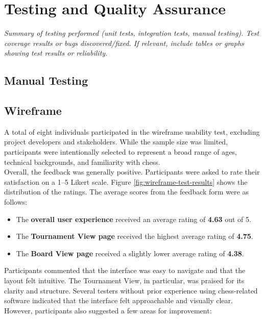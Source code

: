 \section{Testing and Quality Assurance}
\textit{Summary of testing performed (unit tests, integration tests, manual testing). Test coverage results or bugs discovered/fixed. If relevant, include tables or graphs showing test results or reliability.}

\subsection{Manual Testing}

\subsection{Wireframe}
\label{subsec:wireframe-results}

A total of eight individuals participated in the wireframe usability test, excluding project developers and stakeholders. While the sample size was limited, participants were intentionally selected to represent a broad range of ages, technical backgrounds, and familiarity with chess. \\

Overall, the feedback was generally positive. Participants were asked to rate their satisfaction on a 1–5 Likert scale. Figure \ref{fig:wireframe-test-results} shows the distribution of the ratings. The average scores from the feedback form were as follows:

\begin{itemize}
    \item The \textbf{overall user experience} received an average rating of \textbf{4.63} out of 5.
    \item The \textbf{Tournament View page} received the highest average rating of \textbf{4.75}.
    \item The \textbf{Board View page} received a slightly lower average rating of \textbf{4.38}.
\end{itemize}

Participants commented that the interface was easy to navigate and that the layout felt intuitive. The Tournament View, in particular, was praised for its clarity and structure. Several testers without prior experience using chess-related software indicated that the interface felt approachable and visually clear. \\

However, participants also suggested a few areas for improvement:

